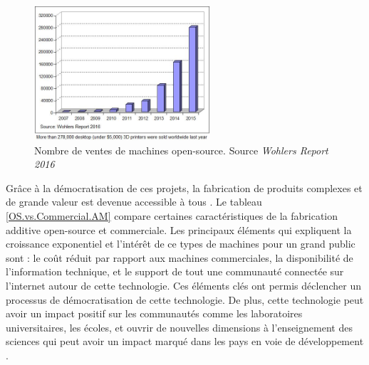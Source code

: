 \begin{figure} [H]
	\centering
	\includegraphics[height=5cm]{Figures/Francais/3DP-Growth.jpg}
	\caption[]{Nombre de ventes de machines open-source. Source \textit{Wohlers Report 2016}}	
	\label{3DP.Growth}
\end{figure}	

Grâce à la démocratisation de ces projets, la fabrication de produits complexes et de grande valeur est devenue accessible à tous \parencite{Kostakis2013,Pearce2014k}.  
Le tableau \ref{OS.vs.Commercial.AM}  compare certaines caractéristiques  de la fabrication additive open-source et commerciale. 
Les principaux éléments qui expliquent la croissance exponentiel et l'intérêt de ce types de machines pour un grand public sont : le coût réduit par rapport aux machines commerciales, la disponibilité de l'information technique, et le support de tout une communauté connectée sur l'internet autour de cette technologie.
Ces éléments clés ont permis déclencher un processus de démocratisation de cette technologie.
De plus, cette technologie peut avoir un impact positif sur les communautés comme les laboratoires universitaires, les écoles, et ouvrir de nouvelles dimensions à l'enseignement des sciences qui peut avoir un impact marqué dans les pays en voie de développement \parencite{Irwin2014}.



